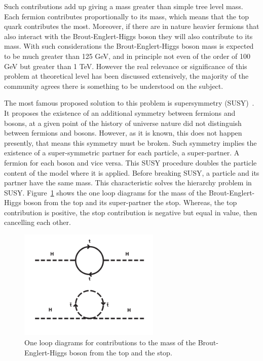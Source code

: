 Such contributions add up giving a mass greater than simple tree level mass. Each fermion contributes proportionally to its mass, which means that the top quark contributes the most. Moreover, if there are in nature heavier fermions that also interact with the Brout-Englert-Higgs boson they will also contribute to its mass. With such considerations the Brout-Englert-Higgs boson mass is expected to be much greater than 125 GeV, and in principle not even of the order of 100 GeV but greater than 1 TeV. However the real relevance or significance of this problem at theoretical level has been discussed extensively, the majority of the community agrees there is something to be understood on the subject. 

The most famous proposed solution to this problem is supersymmetry (SUSY)~\cite{Fayet:1977yc,Martin:1997ns}. It proposes the existence of an additional symmetry between fermions and bosons, at a given point of the history of universe nature did not distinguish between fermions and bosons. However, as it is known, this does not happen presently, that means this symmetry must be broken. Such symmetry implies the existence of a super-symmetric partner for each particle, a super-partner. A fermion for each boson and vice versa. This SUSY procedure doubles the particle content of the model where it is applied. Before breaking SUSY, a particle and its partner have the same mass. This characteristic solves the hierarchy problem in SUSY. Figure~\ref{fig:susy} shows the one loop diagrams for the mass of the Brout-Englert-Higgs boson from the top and its super-partner the stop. Whereas, the top contribution is positive, the stop contribution is negative but equal in value, then cancelling each other.

\begin{figure}[!Hhtbp]
  \begin{center}
    \includegraphics[width=0.6\textwidth]{figs/SUSY.png}
    \caption{One loop diagrams for contributions to the mass of the Brout-Englert-Higgs boson from the top and the stop.}
    \label{fig:susy}
  \end{center}
\end{figure}

